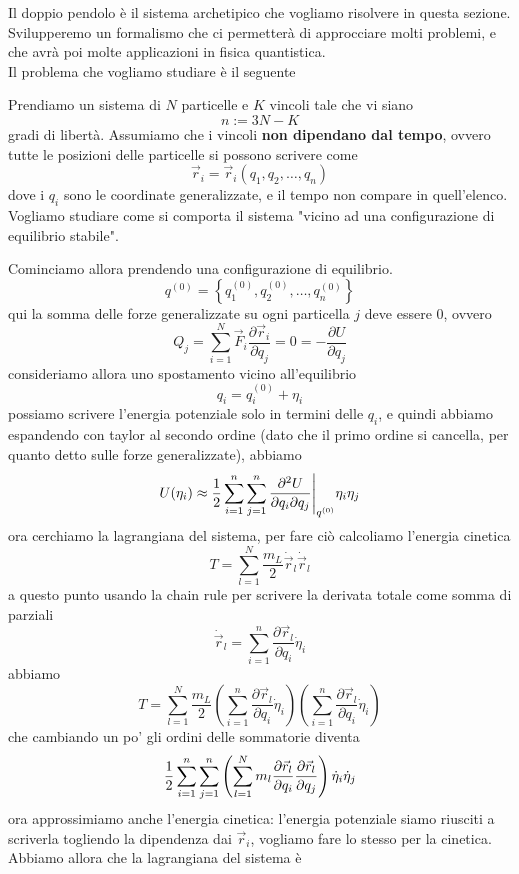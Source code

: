 \documentclass[11pt]{scrartcl}
\newcommand{\posit}{\vec{r}}
\newcommand{\veloc}{\dot{\vec{r}}}
\begin{document}
	Il doppio pendolo è il sistema archetipico che vogliamo risolvere in questa sezione. Svilupperemo un formalismo che ci permetterà di approcciare molti problemi, e che avrà poi molte applicazioni in fisica quantistica. \\
	Il problema che vogliamo studiare è il seguente
	\begin{problem}
		Prendiamo un sistema di $N$ particelle e $K$ vincoli tale che vi siano
		$$n:=3N-K$$
		gradi di libertà. Assumiamo che i vincoli \textbf{non dipendano dal tempo}, ovvero tutte le posizioni delle particelle si possono scrivere come
		$$\posit_i=\posit_i\left(q_1,q_2,\dots,q_n\right)$$
		dove i $q_i$ sono le coordinate generalizzate, e il tempo non compare in quell'elenco. Vogliamo studiare come si comporta il sistema "vicino ad una configurazione di equilibrio stabile".
	\end{problem}
	Cominciamo allora prendendo una configurazione di equilibrio. 
	$$q^{(0)}=\left\{q_1^{(0)},q_2^{(0)},\dots,q_n^{(0)}\right\}$$
	qui la somma delle forze generalizzate su ogni particella $j$ deve essere $0$, ovvero
	$$Q_j=\sum_{i=1}^{N}\vec{F}_i\frac{\partial \posit_i}{\partial q_j}=0=-\frac{\partial U}{\partial q_j}$$
	consideriamo allora uno spostamento vicino all'equilibrio
	$$q_i=q_i^{(0)}+\eta_i$$
	possiamo scrivere l'energia potenziale solo in termini delle $q_i$, e quindi abbiamo espandendo con taylor al secondo ordine (dato che il primo ordine si cancella, per quanto detto sulle forze generalizzate), abbiamo
	$$U(\eta_i)\approx \frac{1}{2} \sum_{i=1}^{n}\sum_{j=1}^{n}\frac{\partial^2 U}{\partial q_i \partial q_j}\Bigg|_{q^{(0)}}\eta_i\eta_j$$
	ora cerchiamo la lagrangiana del sistema, per fare ciò calcoliamo l'energia cinetica
	$$T=\sum_{l=1}^{N}\frac{m_L}{2}\veloc_l\veloc_l$$
	a questo punto usando la chain rule per scrivere la derivata totale come somma di parziali
	$$\veloc_l=\sum_{i=1}^{n}\frac{\partial \posit_l}{\partial q_i}\dot{\eta}_i$$
	abbiamo
	$$T=\sum_{l=1}^{N}\frac{m_L}{2}\left(\sum_{i=1}^{n}\frac{\partial \posit_l}{\partial q_i}\dot{\eta}_i\right)\left(\sum_{i=1}^{n}\frac{\partial \posit_l}{\partial q_i}\dot{\eta}_i\right)$$
	che cambiando un po' gli ordini delle sommatorie diventa
	$$\half\sum_{i=1}^n\sum_{j=1}^n\left(\sum_{l=1}^N m_l \frac{\partial \posit_l}{\partial q_i}\frac{\partial \posit_l}{\partial q_j}\right)\dot{\eta}_i\dot{\eta}_j$$
	ora approssimiamo anche l'energia cinetica: l'energia potenziale siamo riusciti a scriverla togliendo la dipendenza dai $\posit_i$, vogliamo fare lo stesso per la cinetica. Abbiamo allora che la lagrangiana del sistema è
\end{document}
